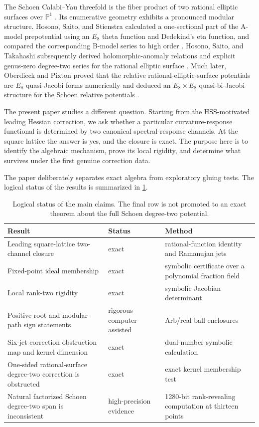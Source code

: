 \documentclass[11pt]{article}
\theoremstyle{definition}
\theoremstyle{remark}
\begin{document}
The Schoen Calabi--Yau threefold is the fiber product of two rational elliptic surfaces over \(\mathbb P^1\) \cite{Schoen}.  Its enumerative geometry exhibits a pronounced modular structure.  Hosono, Saito, and Stienstra calculated a one-sectional part of the A-model prepotential using an \(E_8\) theta function and Dedekind's eta function, and compared the corresponding B-model series to high order \cite{HSS}.  Hosono, Saito, and Takahashi subsequently derived holomorphic-anomaly relations and explicit genus-zero degree-two series for the rational elliptic surface \cite{HST}.  Much later, Oberdieck and Pixton proved that the relative rational-elliptic-surface potentials are \(E_8\) quasi-Jacobi forms numerically and deduced an \(E_8\times E_8\) quasi-bi-Jacobi structure for the Schoen relative potentials \cite{OP}.

The present paper studies a different question.  Starting from the HSS-motivated leading Hessian correction, we ask whether a particular curvature-response functional is determined by two canonical spectral-response channels.  At the square lattice the answer is yes, and the closure is exact.  The purpose here is to identify the algebraic mechanism, prove its local rigidity, and determine what survives under the first genuine correction data.

The paper deliberately separates exact algebra from exploratory gluing tests.  The logical status of the results is summarized in \cref{tab:status}.

\begin{table}[ht]
\centering
\small
\begin{tabular}{p{}p{}p{}}
\toprule
Result & Status & Method \\
\midrule
Leading square-lattice two-channel closure & exact & rational-function identity and Ramanujan jets \\
Fixed-point ideal membership & exact & symbolic certificate over a polynomial fraction field \\
Local rank-two rigidity & exact & symbolic Jacobian determinant \\
Positive-root and modular-path sign statements & rigorous computer-assisted & Arb/real-ball enclosures \\
Six-jet correction obstruction map and kernel dimension & exact & dual-number symbolic calculation \\
One-sided rational-surface degree-two correction is obstructed & exact & exact kernel membership test \\
Natural factorized Schoen degree-two span is inconsistent & high-precision evidence & 1280-bit rank-revealing computation at thirteen points \\
\bottomrule
\end{tabular}
\caption{Logical status of the main claims.  The final row is not promoted to an exact theorem about the full Schoen degree-two potential.}
\label{tab:status}
\end{table}
\end{document}
